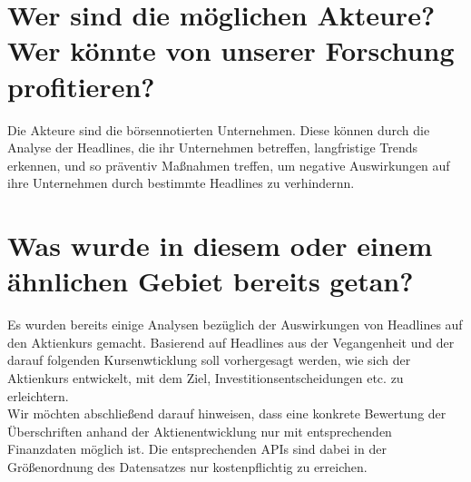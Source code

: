 \section*{Wer sind die möglichen Akteure? Wer könnte von unserer Forschung profitieren?}
Die Akteure sind die börsennotierten Unternehmen. Diese können durch die Analyse der Headlines, die ihr Unternehmen betreffen, langfristige Trends erkennen, und so präventiv Maßnahmen treffen, um negative Auswirkungen auf ihre Unternehmen durch bestimmte Headlines zu verhindernn.


\section*{Was wurde in diesem oder einem ähnlichen Gebiet bereits getan?}
Es wurden bereits einige Analysen bezüglich der Auswirkungen von Headlines auf den Aktienkurs gemacht. Basierend auf Headlines aus der Vegangenheit und der darauf folgenden Kursenwticklung soll vorhergesagt werden, wie sich der Aktienkurs entwickelt, mit dem Ziel, Investitionsentscheidungen etc. zu erleichtern.\\

Wir möchten abschließend darauf hinweisen, dass eine konkrete Bewertung der Überschriften anhand der Aktienentwicklung nur mit entsprechenden Finanzdaten möglich ist. Die entsprechenden APIs sind dabei in der Größenordnung des Datensatzes nur kostenpflichtig zu erreichen.

\citep[see][]{yahoofinance} \citep[see][]{econ_topicmodelling}
